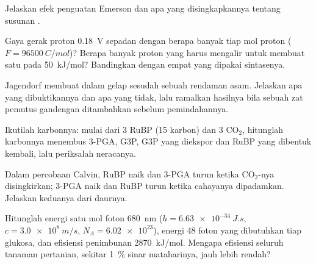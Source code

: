 \begin{exercise}[$\star\star$]\label{exo:b1:photosynthesis:5}
Jelaskan efek penguatan Emerson dan apa yang disingkapkannya tentang
susunan .
\end{exercise}

\begin{exercise}[$\star\star$]\label{exo:b1:photosynthesis:6}
Gaya gerak proton \qty{0.18}{V} sepadan dengan berapa banyak  tiap mol proton ($F = \qty{96500}{C/mol}$)? Berapa banyak proton
yang harus mengalir untuk membuat satu  pada \qty{50}{kJ/mol}?
Bandingkan dengan empat yang dipakai sintasenya.
\end{exercise}

\begin{exercise}[$\star\star$]\label{exo:b1:photosynthesis:7}
 Jagendorf membuat  dalam gelap sesudah sebuah rendaman
asam. Jelaskan apa yang dibuktikannya dan apa yang tidak, lalu ramalkan
hasilnya bila sebuah zat pemutus gandengan ditambahkan sebelum
pemindahannya.
\end{exercise}

\begin{exercise}[$\star\star$]\label{exo:b1:photosynthesis:8}
Ikutilah karbonnya: mulai dari 3 RuBP (15 karbon) dan 3
$\mathrm{CO_2}$, hitunglah karbonnya menembus 3-PGA, G3P, G3P yang
diekspor dan RuBP yang dibentuk kembali, lalu periksalah neracanya.
\end{exercise}

\begin{exercise}[$\star\star$]\label{exo:b1:photosynthesis:9}
Dalam percobaan Calvin, RuBP naik dan 3-PGA turun ketika
$\mathrm{CO_2}$-nya disingkirkan; 3-PGA naik dan RuBP turun ketika
cahayanya dipadamkan. Jelaskan keduanya dari daurnya.
\end{exercise}

\begin{exercise}[$\star\star\star$]\label{exo:b1:photosynthesis:10}
Hitunglah energi satu mol foton \qty{680}{nm} ($h =
\qty{6.63e-34}{J.s}$, $c = \qty{3.0e8}{m/s}$, $N_A = \num{6.02e23}$),
energi 48 foton yang dibutuhkan tiap glukosa, dan efisiensi penimbunan
\qty{2870}{kJ/mol}. Mengapa efisiensi seluruh tanaman pertanian,
sekitar \qty{1}{\%} sinar mataharinya, jauh lebih rendah?
\end{exercise}

